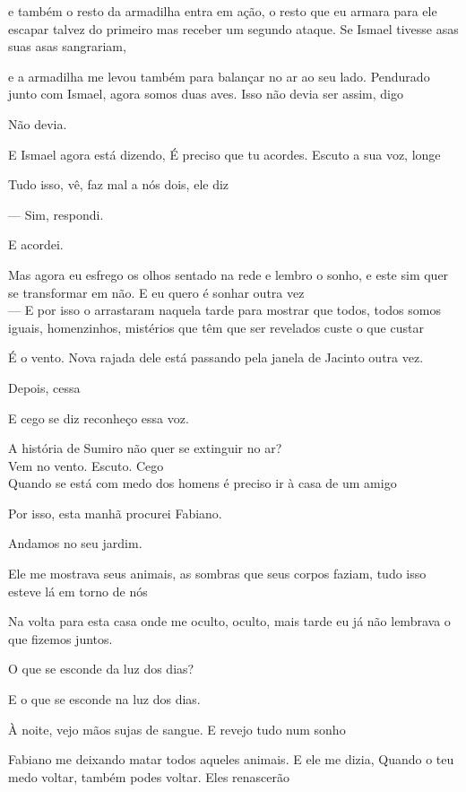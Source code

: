 e também o resto da armadilha entra em ação, o resto que eu armara para
ele escapar talvez do primeiro mas receber um segundo ataque. Se Ismael
tivesse asas suas asas sangrariam,

e a armadilha me levou também para balançar no ar ao seu lado. Pendurado
junto com Ismael, agora somos duas aves. Isso não devia ser assim, digo

Não devia.

E Ismael agora está dizendo, É preciso que tu acordes. Escuto a sua voz,
longe

Tudo isso, vê, faz mal a nós dois, ele diz

--- Sim, respondi.

E acordei.

Mas agora eu esfrego os olhos sentado na rede e lembro o sonho, e este
sim quer se transformar em não. E eu quero é sonhar outra vez\\

--- E por isso o arrastaram naquela tarde para mostrar que todos, todos
somos iguais, homenzinhos, mistérios que têm que ser revelados custe o
que custar

É o vento. Nova rajada dele está passando pela janela de Jacinto outra
vez.

Depois, cessa

E cego se diz reconheço essa voz.

A história de Sumiro não quer se extinguir no ar?\\

Vem no vento. Escuto. Cego\\

Quando se está com medo dos homens é preciso ir à casa de um amigo

Por isso, esta manhã procurei Fabiano.

Andamos no seu jardim.

Ele me mostrava seus animais, as sombras que seus corpos faziam, tudo
isso esteve lá em torno de nós

Na volta para esta casa onde me oculto, oculto, mais tarde eu já não
lembrava o que fizemos juntos.

O que se esconde da luz dos dias?

E o que se esconde na luz dos dias.

À noite, vejo mãos sujas de sangue. E revejo tudo num sonho

Fabiano me deixando matar todos aqueles animais. E ele me dizia, Quando
o teu medo voltar, também podes voltar. Eles renascerão\\

